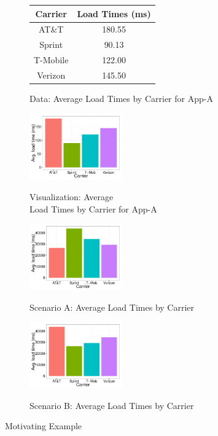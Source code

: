 \begin{figure}[h]
\vspace{-10pt}
	\centering
	\begin{subfigure}{0.49\linewidth}
	   \begin{tabular}{cc} \hline
		  Carrier & Load Times (ms) \\ \hline
		  AT\&T & 180.55 \\ \hline
		  Sprint & 90.13 \\ \hline
		  T-Mobile & 122.00 \\ \hline
		  Verizon &  145.50\\ \hline
		  \end{tabular}
		  \caption{Data: Average Load Times by Carrier for App-A} \label{tab:staplerX}
	\end{subfigure}
	\begin{subfigure}{0.49\linewidth}
		\centering
		{\includegraphics[width=4cm] {Images/dist1.pdf}}
		\caption{Visualization: Average \\ Load Times by Carrier
		 for App-A}
		\label{fig:staplerX}
	\end{subfigure}
	
	\centering
	\begin{subfigure}{0.49\linewidth}
		{\includegraphics[width=4cm] {Images/dist2.pdf}}
		\caption{Scenario A: Average Load Times by Carrier}
		\label{fig:staplerX-a}
	\end{subfigure}
	\begin{subfigure}{0.49\linewidth}
		\centering
		{\includegraphics[width=4cm] {Images/dist3.pdf}}
		\caption{Scenario B: Average Load Times by Carrier}
		\label{fig:staplerX-b}
	\end{subfigure}
	\vspace{-10pt}
	\caption{Motivating Example}
	\label{fig:intro}
	\vspace{-10pt}
\end{figure}

